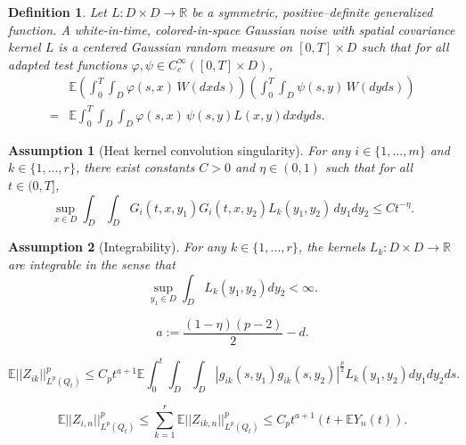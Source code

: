 \documentclass[10pt,a4paper]{amsart}
\newtheorem{assumption}{Assumption}
\newtheorem{definition}{Definition}
\begin{document}
\begin{definition}\label{def: space time noise}
    Let $L: D\times D\rightarrow \mathbb R$ be a symmetric, positive--definite generalized function. A white-in-time, colored-in-space Gaussian noise with spatial covariance kernel $L$ is a centered Gaussian random measure on $[0,T]\times D$ such that for all adapted test functions $\varphi,\psi\in C^{\infty}_c([0,T]\times D)$,
\begin{align*}\label{eq: space time noise}
&\mathbb{E}
\left(\int_0^T\int_D \varphi(s,x)\,W(dxds)\right)
\left(\int_0^T\int_D \psi(s,y)\,W(dyds)\right)
\\
=&\mathbb E\int_0^T\int_D\int_D
\varphi(s,x)\,\psi(s,y)L(x,y)dxdyds.
\end{align*}
\end{definition}

\begin{assumption}[Heat kernel convolution singularity]\label{assump: convolution singularity}
    For any $i\in \{1,...,m\}$ and $k\in \{1,...,r\}$, there exist constants $C>0$ and $\eta\in(0,1)$ such that for all $t\in(0,T]$,
\begin{equation}\label{eq:L2}
\sup_{x\in D}\int_D\int_D G_i(t,x,y_1)G_i(t,x,y_2)L_k(y_1,y_2)\,dy_1dy_2
\le C t^{-\eta}.
\end{equation}
\end{assumption}

\begin{assumption}[Integrability]\label{assump: Integrability of kernel L} For any $k\in \{1,...,r\}$, the kernels $L_k: D\times D\rightarrow \mathbb R$ are integrable in the sense that
    \[
    \sup_{y_1\in D}\int_{D} L_k(y_1,y_2)dy_2<\infty.
    \]
\end{assumption}

    \begin{equation}\label{eq: alpha}
a := \frac{(1-\eta)(p-2)}{2}-d.
    \end{equation}

\begin{equation}\label{eq: Lp norm Z}
\mathbb E||Z_{ik}||_{L^p(Q_t)}^{p}
\leq C_p t^{a+1}
\mathbb E\int_0^t\int_D\int_D
|g_{ik}(s,y_1)g_{ik}(s,y_2)|^{\frac{p}{2}}
L_k(y_1,y_2)dy_1dy_2ds.
\end{equation}

\begin{equation}\label{eq: Lp norm Z_i}
\mathbb E||Z_{i,n}||^p_{L^p(Q_t)} \leq \sum_{k=1}^r \mathbb E||Z_{ik,n}||^p_{L^p(Q_t)}\leq C_pt^{a+1}(t+\mathbb EY_n(t)).
\end{equation}
\end{document}
